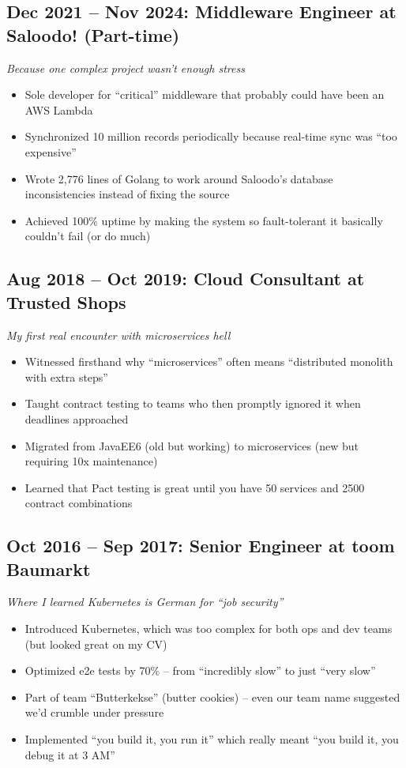 \documentclass[10pt,a4paper]{article}
\begin{document}
\subsection*{Dec 2021 -- Nov 2024: Middleware Engineer at Saloodo! (Part-time)}
\textit{Because one complex project wasn't enough stress}
\begin{itemize}
\item Sole developer for ``critical'' middleware that probably could have been an AWS Lambda
\item Synchronized 10 million records periodically because real-time sync was ``too expensive''
\item Wrote 2,776 lines of Golang to work around Saloodo's database inconsistencies instead of fixing the source
\item Achieved 100\% uptime by making the system so fault-tolerant it basically couldn't fail (or do much)
\end{itemize}

\subsection*{Aug 2018 -- Oct 2019: Cloud Consultant at Trusted Shops}
\textit{My first real encounter with microservices hell}
\begin{itemize}
\item Witnessed firsthand why ``microservices'' often means ``distributed monolith with extra steps''
\item Taught contract testing to teams who then promptly ignored it when deadlines approached
\item Migrated from JavaEE6 (old but working) to microservices (new but requiring 10x maintenance)
\item Learned that Pact testing is great until you have 50 services and 2500 contract combinations
\end{itemize}

\subsection*{Oct 2016 -- Sep 2017: Senior Engineer at toom Baumarkt}
\textit{Where I learned Kubernetes is German for ``job security''}
\begin{itemize}
\item Introduced Kubernetes, which was too complex for both ops and dev teams (but looked great on my CV)
\item Optimized e2e tests by 70\% -- from ``incredibly slow'' to just ``very slow''
\item Part of team ``Butterkekse'' (butter cookies) -- even our team name suggested we'd crumble under pressure
\item Implemented ``you build it, you run it'' which really meant ``you build it, you debug it at 3 AM''
\end{itemize}
\end{document}
